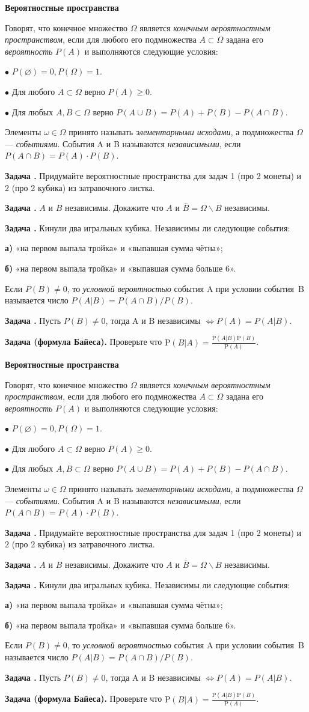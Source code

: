\documentclass[11pt,a4paper]{article}
\def\P{\mathrm{P}}
\newcounter{znum}
\newcommand{\z}[1]{\addtocounter{znum}{1} \textbf{Задача \arabic{znum}#1. }}
\renewcommand{\!}{\textcolor{red}{!}}
\newcommand{\double}[1]{
	#1
	\vspace{2cm}
	\setcounter{znum}{0}
	#1
}
\begin{document}
\thispagestyle{empty}

\double{

\begin{center}
	\large
	\textbf{Вероятностные пространства}
	\normalsize
\end{center}

Говорят, что конечное множество $\Omega$ является \emph{конечным вероятностным пространством}, если для любого его подмножества $A \subset \Omega$ задана его \emph{вероятность} $P(A)$ и выполняются следующие условия:

$\bullet$ $P(\varnothing) = 0, P(\Omega) = 1$.

$\bullet$ Для любого $A \subset \Omega$ верно $P(A) \geqslant 0$.

$\bullet$ Для любых $A, B\subset \Omega$ верно $P(A\cup B) = P(A) + P(B) - P(A\cap B)$.

Элементы $\omega \in \Omega$ принято называть \emph{элементарными исходами}, а подмножества $\Omega$ --- \emph{событиями}. События A и B называются \emph{независимыми}, если $P(A \cap B) = P(A) \cdot P(B)$.

\z{} Придумайте вероятностные пространства для задач 1 (про 2 монеты) и 2 (про 2 кубика) из затравочного листка.

\z{} $A$ и $B$ независимы. Докажите что $A$ и $\overline{B} = \Omega \backslash B$ независимы.

\z{} Кинули два игральных кубика. Независимы ли следующие события:

\textbf{а)} «на первом выпала тройка» и «выпавшая сумма чётна»;

\textbf{б)} «на первом выпала тройка» и «выпавшая сумма больше 6».

\vspace{0.3cm}

Если $P(B) \ne 0$, то \emph{условной вероятностью} события A при условии события~B называется число $P(A|B) = P(A \cap B)/P(B)$.

\vspace{0.3cm}

\z{} Пусть $P(B) \ne 0$, тогда A и B независимы $ \Leftrightarrow P(A) = P(A|B)$.

\z{ (формула Байеса)} Проверьте что $\P(B | A) = \frac{\P(A | B)\P(B)}{\P(A)}$.

}
\end{document}
